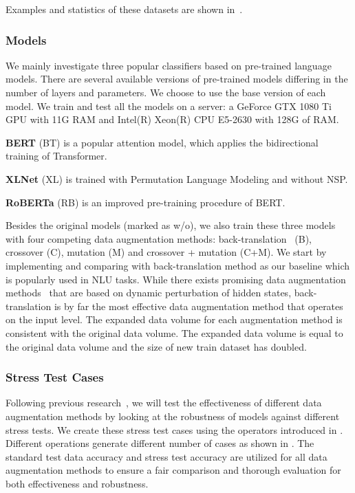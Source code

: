 Examples and statistics of these datasets are shown in~. 

\subsubsection{Models}
We mainly investigate three popular classifiers based on pre-trained language models. 
There are several available versions of pre-trained models differing in the number of layers and parameters. We choose to use the base version of each model. We train and test all the models on a server: a GeForce GTX 1080 Ti GPU with 11G RAM and Intel(R) Xeon(R) CPU E5-2630 with 128G of RAM.

\textbf{BERT} (BT) is a popular attention model, which applies the bidirectional training of Transformer. 

\textbf{XLNet} (XL) is trained with Permutation Language Modeling and without NSP.

\textbf{RoBERTa} (RB) is an improved pre-training procedure of BERT.

Besides the original models (marked as w/o), we also train these three
models with four competing data augmentation methods: 
back-translation~\cite{back2019} (B),  crossover (C), mutation (M)
and crossover + mutation (C+M). 
We start by implementing and comparing with back-translation method as our baseline which is 
popularly used in NLU tasks. While there exists promising data augmentation methods~\cite{qu2020coda,chen-etal-2021-hiddencut} that are based on dynamic perturbation of hidden states, back-translation is by far the most
effective data augmentation method that operates on the input level.
The expanded data volume for each augmentation method is consistent with the original data volume.
The expanded data volume is equal to the original data volume and 
the size of new train dataset has doubled.

\subsubsection{Stress Test Cases}
Following previous research~\cite{checklist2020acl}, 
we will test the effectiveness of different data augmentation
methods by looking at the robustness of models against
different stress tests.
We create these stress test cases using the operators
introduced in .
Different operations generate different number of cases 
as shown in . 
The standard test data accuracy and stress test accuracy are utilized for all 
data augmentation methods to ensure a fair comparison and thorough evaluation for 
both effectiveness and robustness. 



